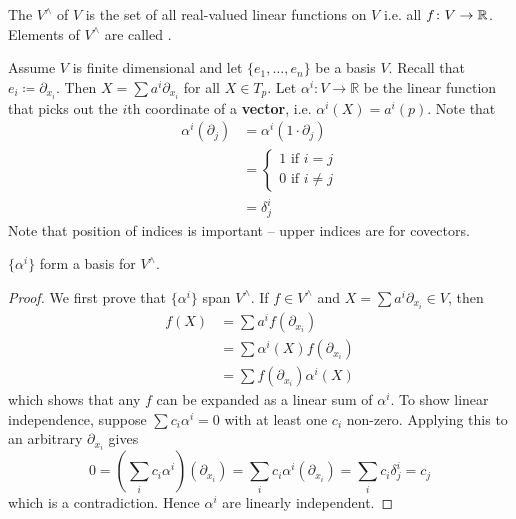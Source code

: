 \newcommand{\pdx}[1]{\partial_{x_{#1}}}
\newcommand*{\vwedge}{V^\wedge }
\newcommand*{\vx}{X = \sum a^i \partial_{x_i}}

The  \(\vwedge\) of \(V\) is the set of all real-valued linear functions on \(V\) i.e. all \(f \colon V \rightarrow \mathbb{R}\).
%
Elements of \(\vwedge\) are called .

Assume \(V\) is finite dimensional and let \(\{e_1, \dots, e_n\}\) be a basis \(V\).
%
Recall that \(e_i \coloneqq \partial_{x_i}\).
%
Then \(\vx\) for all \(X \in T_p\).
%
Let \(\alpha^i \colon V \rightarrow \mathbb{R}\) be the linear function that picks out the \(i\)th coordinate of a \textbf{vector}, i.e. \(\alpha^i(X) = a^i(p)\).
%
Note that
%
\begin{align}
    \alpha^i(\partial_j) & = \alpha^i(1\cdot \partial_j) \\
                         & = \begin{cases}
        1 \text{ if } i = j \\
        0 \text{ if } i \neq j
    \end{cases}  \\
                         & =\delta_j^i
\end{align}
%
Note that position of indices is important -- upper indices are for covectors.
%
\begin{proposition}{}{}
    \(\{\alpha^i\}\) form a basis for \(\vwedge\).
\end{proposition}
%
\begin{proof}
    We first prove that \(\{\alpha^i\}\) span \(\vwedge\). If \(f \in V^\wedge\) and \(\vx \in V\), then
    \begin{align}
        f(X) & = \sum a^i f(\pdx{i})          \\
             & = \sum \alpha^i(X) f(\pdx{i})  \\
             & = \sum f(\pdx{i}) \alpha^i (X)
    \end{align}
    which shows that any \(f\) can be expanded as a linear sum of \(\alpha^i\).
    To show linear independence, suppose \(\sum c_i \alpha^i = 0\) with at least one \(c_i\) non-zero. Applying this to an arbitrary \(\pdx{i}\) gives
    \begin{equation}
        0 = \left(\sum_i c_i \alpha^i   \right)(\pdx{i}) = \sum_i c_i \alpha^i(\pdx{i}) = \sum_i c_i \delta_j^i = c_j
    \end{equation}
    which is a contradiction. Hence \(\alpha^i\) are linearly independent.
\end{proof}
